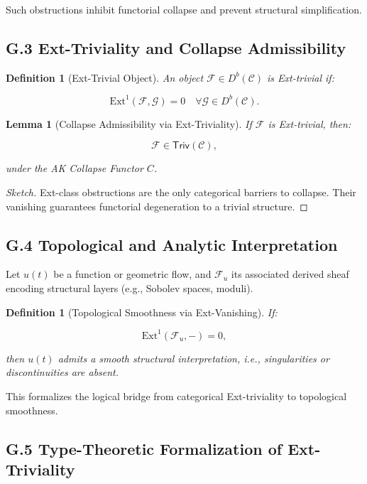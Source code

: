 \documentclass[11pt]{article}
\newtheorem{definition}[theorem]{Definition}
\newtheorem{lemma}[theorem]{Lemma}
\begin{document}
Such obstructions inhibit functorial collapse and prevent structural simplification.

\subsection*{G.3 Ext-Triviality and Collapse Admissibility}

\begin{definition}[Ext-Trivial Object]
An object \( \mathcal{F} \in D^b(\mathcal{C}) \) is \emph{Ext-trivial} if:

\[
\mathrm{Ext}^1(\mathcal{F}, \mathcal{G}) = 0 \quad \forall \mathcal{G} \in D^b(\mathcal{C}).
\]
\end{definition}

\begin{lemma}[Collapse Admissibility via Ext-Triviality]
If \( \mathcal{F} \) is Ext-trivial, then:

\[
\mathcal{F} \in \mathsf{Triv}(\mathcal{C}),
\]

under the AK Collapse Functor \( C \).
\end{lemma}

\begin{proof}[Sketch]
Ext-class obstructions are the only categorical barriers to collapse. Their vanishing guarantees functorial degeneration to a trivial structure.
\end{proof}

\subsection*{G.4 Topological and Analytic Interpretation}

Let \( u(t) \) be a function or geometric flow, and \( \mathcal{F}_u \) its associated derived sheaf encoding structural layers (e.g., Sobolev spaces, moduli).

\begin{definition}[Topological Smoothness via Ext-Vanishing]
If:

\[
\mathrm{Ext}^1(\mathcal{F}_u, -) = 0,
\]

then \( u(t) \) admits a smooth structural interpretation, i.e., singularities or discontinuities are absent.
\end{definition}

This formalizes the logical bridge from categorical Ext-triviality to topological smoothness.

\subsection*{G.5 Type-Theoretic Formalization of Ext-Triviality}
\end{document}
